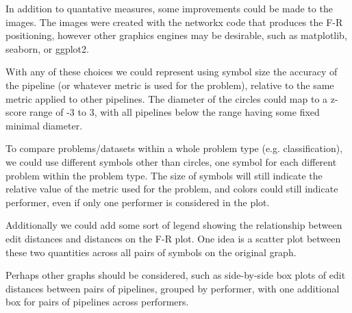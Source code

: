 \documentclass{article}
\begin{document}
In addition to quantative measures, some improvements could be made to
the images.  The images were created with the networkx code that
produces the F-R positioning, however other graphics engines may be
desirable, such as matplotlib, seaborn, or ggplot2.

With any of these choices we could represent using symbol size the
accuracy of the pipeline (or whatever metric is used for the problem),
relative to the same metric applied to other pipelines.  The diameter
of the circles could map to a z-score range of -3 to 3, with all
pipelines below the range having some fixed minimal diameter.

To compare problems/datasets within a whole problem type
(e.g. classification), we could use different symbols other than
circles, one symbol for each different problem within the problem
type.  The size of symbols will still indicate the relative value of
the metric used for the problem, and colors could still indicate
performer, even if only one performer is considered in the plot.

Additionally we could add some sort of legend showing the relationship
between edit distances and distances on the F-R plot.  One idea is a
scatter plot between these two quantities across all pairs of symbols
on the original graph.

Perhaps other graphs should be considered, such as side-by-side box
plots of edit distances between pairs of pipelines, grouped by
performer, with one additional box for pairs of pipelines across
performers.
\end{document}
